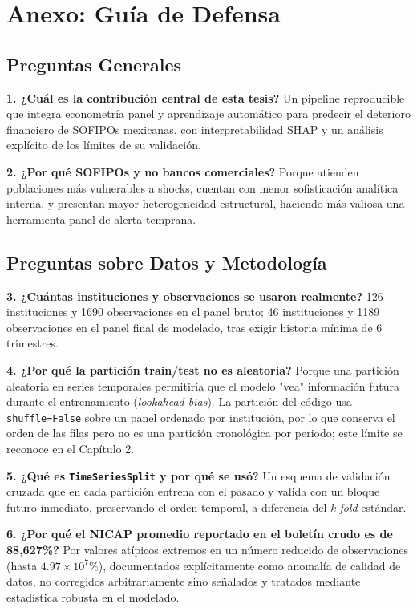 \chapter*{Anexo: Guía de Defensa}

\section*{Preguntas Generales}
\textbf{1. ¿Cuál es la contribución central de esta tesis?} Un pipeline reproducible que integra econometría panel y aprendizaje automático para predecir el deterioro financiero de SOFIPOs mexicanas, con interpretabilidad SHAP y un análisis explícito de los límites de su validación.

\textbf{2. ¿Por qué SOFIPOs y no bancos comerciales?} Porque atienden poblaciones más vulnerables a shocks, cuentan con menor sofisticación analítica interna, y presentan mayor heterogeneidad estructural, haciendo más valiosa una herramienta panel de alerta temprana.

\section*{Preguntas sobre Datos y Metodología}
\textbf{3. ¿Cuántas instituciones y observaciones se usaron realmente?} 126 instituciones y 1690 observaciones en el panel bruto; 46 instituciones y 1189 observaciones en el panel final de modelado, tras exigir historia mínima de 6 trimestres.

\textbf{4. ¿Por qué la partición train/test no es aleatoria?} Porque una partición aleatoria en series temporales permitiría que el modelo "vea" información futura durante el entrenamiento (\textit{lookahead bias}). La partición del código usa \texttt{shuffle=False} sobre un panel ordenado por institución, por lo que conserva el orden de las filas pero no es una partición cronológica por periodo; este límite se reconoce en el Capítulo 2.

\textbf{5. ¿Qué es \texttt{TimeSeriesSplit} y por qué se usó?} Un esquema de validación cruzada que en cada partición entrena con el pasado y valida con un bloque futuro inmediato, preservando el orden temporal, a diferencia del \textit{k-fold} estándar.

\textbf{6. ¿Por qué el NICAP promedio reportado en el boletín crudo es de 88{,}627\%?} Por valores atípicos extremos en un número reducido de observaciones (hasta $4.97\times10^7\%$), documentados explícitamente como anomalía de calidad de datos, no corregidos arbitrariamente sino señalados y tratados mediante estadística robusta en el modelado.

